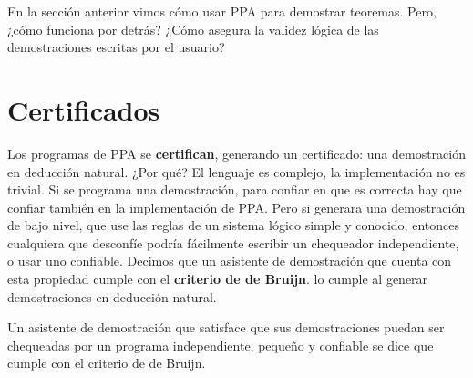 
En la sección anterior vimos cómo usar PPA para demostrar teoremas. Pero, ¿cómo
funciona por detrás? ¿Cómo asegura la validez lógica de las demostraciones
escritas por el usuario?

\section{Certificados}

Los programas de PPA se \textbf{certifican}, generando un certificado: una
demostración en deducción natural. ¿Por qué? El lenguaje es complejo, la
implementación no es trivial. Si se programa una demostración, para confiar en
que es correcta hay que confiar también en la implementación de PPA. Pero si
generara una demostración de bajo nivel, que use las reglas de un sistema lógico
simple y conocido, entonces cualquiera que desconfíe podría fácilmente escribir
un chequeador independiente, o usar uno confiable. Decimos que un asistente de
demostración que cuenta con esta propiedad cumple con el
\textbf{criterio de de Bruijn}. \ppaTool{} lo cumple al generar demostraciones
en deducción natural.

\begin{criterion*} Un asistente de
    demostración que satisface que sus demostraciones puedan ser chequeadas por
    un programa independiente, pequeño y confiable se dice que cumple con el
    criterio de de Bruijn.
\end{criterion*}

